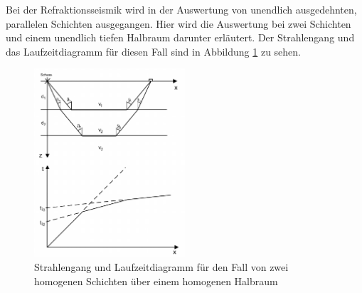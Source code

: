 Bei der Refraktionsseismik wird in der Auswertung von unendlich ausgedehnten, parallelen Schichten ausgegangen. Hier wird die Auswertung bei zwei Schichten und einem unendlich tiefen Halbraum darunter erläutert.
Der Strahlengang und das Laufzeitdiagramm für diesen Fall sind in Abbildung \ref{fig:zweiSchichten} zu sehen.

\begin{figure}
 \centering
 \includegraphics[width=0.5\textwidth]{fig/zweischichten}
 \caption[Strahlengang und Laufzeitdiagramm für den Fall von zwei homogenen Schichten über einem homogenen Halbraum]{Strahlengang und Laufzeitdiagramm für den Fall von zwei homogenen Schichten über einem homogenen Halbraum \cite{skript}}
 \label{fig:zweiSchichten}
\end{figure}

